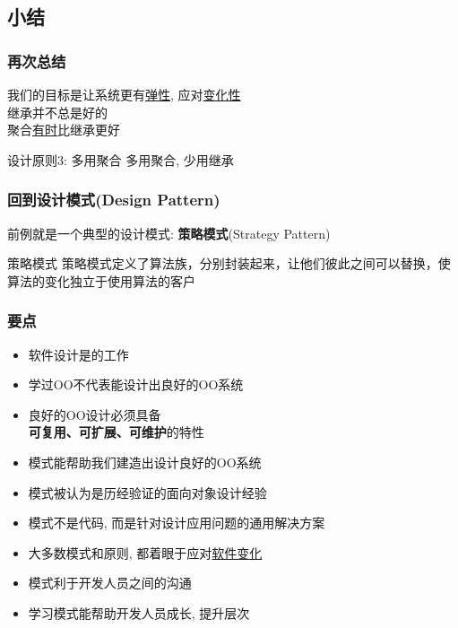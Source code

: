 \documentclass[compress]{beamer}
\begin{document}
\subsection{小结}

\begin{frame}
\frametitle{再次总结}

我们的目标是让系统更有\uline{弹性}, 应对\uline{变化性} \\
继承并不总是好的 \\
聚合\uline{有时}比继承更好 \\[2ex]

\begin{block}{设计原则3: 多用聚合}
多用聚合, 少用继承
\end{block}

\end{frame}

\begin{frame}
\frametitle{回到设计模式(Design Pattern)}
前例就是一个典型的设计模式: \textbf{策略模式}(Strategy Pattern) \\[2ex]

\begin{block}{策略模式}
策略模式定义了算法族，分别封装起来，让他们彼此之间可以替换，使算法的变化独立于使用算法的客户
\end{block}

\end{frame}

\begin{frame}
\frametitle{要点}
 {
\begin{itemize}
\item 软件设计是\textbf{}的工作
\item 学过OO不代表能设计出良好的OO系统
\item 良好的OO设计必须具备 \\
\textbf{可复用、可扩展、可维护}的特性
\item 模式能帮助我们建造出设计良好的OO系统
\end{itemize}
}

 {
\begin{itemize}
\item 模式被认为是历经验证的面向对象设计经验
\item 模式不是代码, 而是针对设计应用问题的通用解决方案
\item 大多数模式和原则, 都着眼于应对\uline{软件变化}
\item 模式利于开发人员之间的沟通
\item 学习模式能帮助开发人员成长, 提升层次
\end{itemize}
}
\end{frame}
\end{document}
